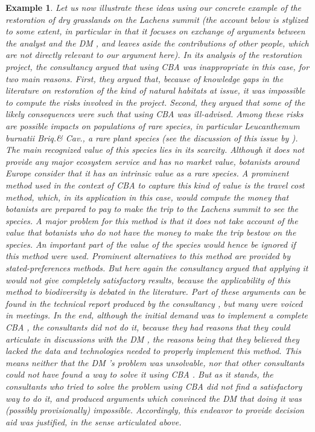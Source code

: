 \documentclass[preprint, french, english, 11pt, authoryear]{elsarticle}%
\newtheorem{example}{Example}
\begin{document}
\begin{example}
Let us now illustrate these ideas using our concrete example of the restoration of dry grasslands on the Lachens summit 
(the account below is stylized to some extent, in particular in that it focuses on exchange of arguments between the analyst and the DM%
, and leaves aside the contributions of other people, which are not directly relevant to our argument here). 
In its analysis of the restoration project, the consultancy argued that using CBA%
 was inappropriate in this case, for two main reasons. 
First, they argued that, because of knowledge gaps in the literature on restoration of the kind of natural habitats at issue, it was impossible to compute the risks involved in the project. 
Second, they argued that some of the likely consequences were such that using CBA%
 was ill-advised.
 Among these risks are possible impacts on populations of rare species, in particular \emph{Leucanthemum burnatii} Briq.\@ \& Cav.\@, a rare plant species (see the discussion of this issue by \citet{meinard_ethical_2016}).
The main recognized value of this species lies in its scarcity. Although it does not provide any major ecosystem service and has no market value, botanists around Europe consider that it has an intrinsic value as a rare species.
A prominent method used in the context of CBA%
 to capture this kind of value is the travel cost method, which, in its application in this case, would compute the money that botanists are prepared to pay to make the trip to the Lachens summit to see the species.
A major problem for this method is that it does not take account of the value that botanists who do not have the money to make the trip bestow on the species. An important part of the value of the species would hence be ignored if this method were used.
Prominent alternatives to this method are provided by stated-preferences methods. But here again the consultancy argued that applying it would not give completely satisfactory results, because the applicability of this method to biodiversity is debated in the literature.
Part of these arguments can be found in the technical report produced by the consultancy \citep{meinard_etude_2015}, but many were voiced in meetings.
In the end, although the initial demand was to implement a complete CBA%
, the consultants did not do it, because they had reasons that they could articulate in discussions with the DM%
, the reasons being that they believed they lacked the data and technologies needed to properly implement this method. 
This means neither that the DM%
’s problem was unsolvable, nor that other consultants could not have found a way to solve it using CBA%
.
But as it stands, the consultants who tried to solve the problem using CBA%
 did not find a satisfactory way to do it, and produced arguments which convinced the DM%
  that doing it was (possibly provisionally) impossible.
Accordingly, this endeavor to provide decision aid was justified, in the sense articulated above.
\end{example}
\end{document}
